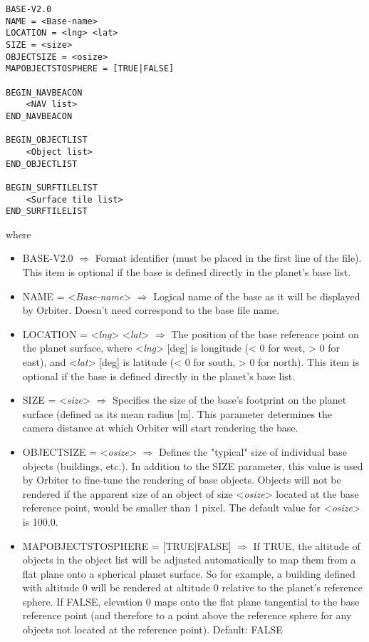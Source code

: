 \documentclass[Orbiter Developer Manual.tex]{subfiles}
\begin{document}
\begin{lstlisting}[language=OSFS]
BASE-V2.0
NAME = <Base-name>
LOCATION = <lng> <lat>
SIZE = <size>
OBJECTSIZE = <osize>
MAPOBJECTSTOSPHERE = [TRUE|FALSE]

BEGIN_NAVBEACON
	<NAV list>
END_NAVBEACON

BEGIN_OBJECTLIST
	<Object list>
END_OBJECTLIST

BEGIN_SURFTILELIST
	<Surface tile list>
END_SURFTILELIST
\end{lstlisting}

\noindent
where

\begin{itemize}
\item BASE-V2.0 $\Rightarrow$ Format identifier (must be placed in the first line of the file). This item is optional if the base is defined directly in the planet's base list.
\item NAME = <\textit{Base-name}> $\Rightarrow$ Logical name of the base as it will be displayed by Orbiter. Doesn't need correspond to the base file name.
\item LOCATION = <\textit{lng}> <\textit{lat}> $\Rightarrow$ The position of the base reference point on the planet surface, where <\textit{lng}> [deg] is longitude (< 0 for west, > 0 for east), and <\textit{lat}> [deg] is latitude (< 0 for south, > 0 for north). This item is optional if the base is defined directly in the planet's base list.
\item SIZE = <\textit{size}> $\Rightarrow$ Specifies the size of the base's footprint on the planet surface (defined as its mean radius [m]. This parameter determines the camera distance at which Orbiter will start rendering the base.
\item OBJECTSIZE = <\textit{osize}> $\Rightarrow$ Defines the "typical" size of individual base objects (buildings, etc.). In addition to the SIZE parameter, this value is used by Orbiter to fine-tune the rendering of base objects. Objects will not be rendered if the apparent size of an object of size <\textit{osize}> located at the base reference point, would be smaller than 1 pixel. The default value for <\textit{osize}> is 100.0.
\item MAPOBJECTSTOSPHERE = [TRUE|FALSE] $\Rightarrow$ If TRUE, the altitude of objects in the object list will be adjusted automatically to map them from a flat plane onto a spherical planet surface. So for example, a building defined with altitude 0 will be rendered at altitude 0 relative to the planet's reference sphere. If FALSE, elevation 0 maps onto the flat plane tangential to the base reference point (and therefore to a point above the reference sphere for any objects not located at the reference point). Default: FALSE\\

\end{itemize}
\end{document}
